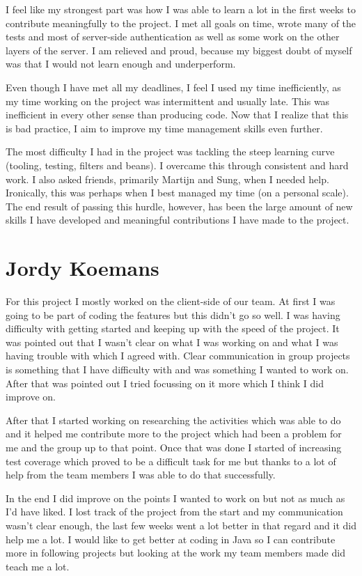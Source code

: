 I feel like my strongest part was how I was able to learn a lot in the first weeks to contribute
meaningfully to the project. I met all goals on time, wrote many of the tests and most of server-side
authentication as well as some work on the other layers of the server. I am relieved and proud, because
my biggest doubt of myself was that I would not learn enough and underperform.

Even though I have met all my deadlines, I feel I used my time inefficiently, as my time working on the
project was intermittent and usually late. This was inefficient in every other sense than producing code.
Now that I realize that this is bad practice, I aim to improve my time management skills even further.

The most difficulty I had in the project was tackling the steep learning curve (tooling, testing, filters
and beans). I overcame this through consistent and hard work. I also asked friends, primarily Martijn and Sung,
when I needed help. Ironically, this was perhaps when I best managed my time (on a personal scale). The end result
of passing this hurdle, however, has been the large amount of new skills I have developed and meaningful contributions
I have made to the project.


\section{Jordy Koemans}
For this project I mostly worked on the client-side of our team. At first I was going to be part of coding the features 
but this didn't go so well. I was having difficulty with getting started and keeping up with the speed of the project. 
It was pointed out that I wasn't clear on what I was working on and what I was having trouble with which I agreed with. 
Clear communication in group projects is something that I have difficulty with and was something I wanted to work on. After 
that was pointed out I tried focussing on it more which I think I did improve on.

After that I started working on researching the activities which was able to do and it helped me contribute more to the project
which had been a problem for me and the group up to that point. Once that was done I started of increasing test coverage which 
proved to be a difficult task for me but thanks to a lot of help from the team members I was able to do that successfully.

In the end I did improve on the points I wanted to work on but not as much as I'd have liked. I lost track of the project from 
the start and my communication wasn't clear enough, the last few weeks went a lot better in that regard and it did help me a lot. 
I would like to get better at coding in Java so I can contribute more in following projects but looking at the work my team members 
made did teach me a lot.

